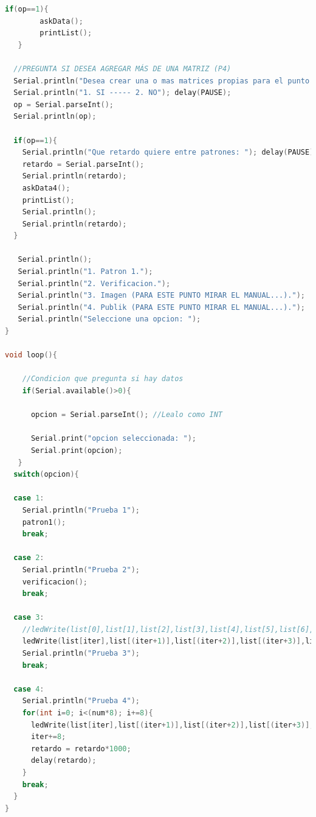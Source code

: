 \documentclass{article}
\begin{document}
\begin{lstlisting}[language=C++, label=codigo_ejemplo]
   if(op==1){
		askData();
        printList();
   }
  
  //PREGUNTA SI DESEA AGREGAR MÁS DE UNA MATRIZ (P4)
  Serial.println("Desea crear una o mas matrices propias para el punto 4?");
  Serial.println("1. SI ----- 2. NO"); delay(PAUSE);
  op = Serial.parseInt();
  Serial.println(op);
  
  if(op==1){
    Serial.println("Que retardo quiere entre patrones: "); delay(PAUSE);
    retardo = Serial.parseInt();
    Serial.println(retardo);
	askData4();
    printList();
    Serial.println();
    Serial.println(retardo);
  }
  
   Serial.println();
   Serial.println("1. Patron 1.");
   Serial.println("2. Verificacion.");
   Serial.println("3. Imagen (PARA ESTE PUNTO MIRAR EL MANUAL...).");
   Serial.println("4. Publik (PARA ESTE PUNTO MIRAR EL MANUAL...).");
   Serial.println("Seleccione una opcion: ");
}

void loop(){
  
    //Condicion que pregunta si hay datos
    if(Serial.available()>0){
   
      opcion = Serial.parseInt(); //Lealo como INT
      
      Serial.print("opcion seleccionada: ");
      Serial.print(opcion);
   }
  switch(opcion){
    
  case 1:
    Serial.println("Prueba 1");
    patron1();
    break;
    
  case 2:
    Serial.println("Prueba 2");
    verificacion();
    break;
    
  case 3:
    //ledWrite(list[0],list[1],list[2],list[3],list[4],list[5],list[6],list[7]); delay(TEMPO);
    ledWrite(list[iter],list[(iter+1)],list[(iter+2)],list[(iter+3)],list[(iter+4)],list[(iter+5)],list[(iter+6)],list[(iter+7)]); delay(TEMPO);
  	Serial.println("Prueba 3");
 	break;
    
  case 4:
  	Serial.println("Prueba 4");
    for(int i=0; i<(num*8); i+=8){
      ledWrite(list[iter],list[(iter+1)],list[(iter+2)],list[(iter+3)],list[(iter+4)],list[(iter+5)],list[(iter+6)],list[(iter+7)]); delay(TEMPO);
      iter+=8;
      retardo = retardo*1000;
      delay(retardo);    
    }
  	break;
  }
}
\end{lstlisting}
\end{document}
